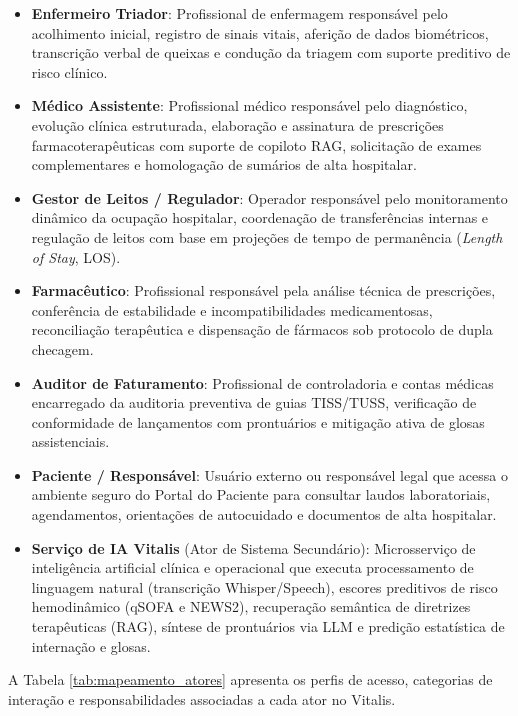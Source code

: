 \begin{itemize}[leftmargin=*]
    \item \textbf{Enfermeiro Triador}: Profissional de enfermagem responsável pelo acolhimento inicial, registro de sinais vitais, aferição de dados biométricos, transcrição verbal de queixas e condução da triagem com suporte preditivo de risco clínico.
    \item \textbf{Médico Assistente}: Profissional médico responsável pelo diagnóstico, evolução clínica estruturada, elaboração e assinatura de prescrições farmacoterapêuticas com suporte de copiloto RAG, solicitação de exames complementares e homologação de sumários de alta hospitalar.
    \item \textbf{Gestor de Leitos / Regulador}: Operador responsável pelo monitoramento dinâmico da ocupação hospitalar, coordenação de transferências internas e regulação de leitos com base em projeções de tempo de permanência (\textit{Length of Stay}, LOS).
    \item \textbf{Farmacêutico}: Profissional responsável pela análise técnica de prescrições, conferência de estabilidade e incompatibilidades medicamentosas, reconciliação terapêutica e dispensação de fármacos sob protocolo de dupla checagem.
    \item \textbf{Auditor de Faturamento}: Profissional de controladoria e contas médicas encarregado da auditoria preventiva de guias TISS/TUSS, verificação de conformidade de lançamentos com prontuários e mitigação ativa de glosas assistenciais.
    \item \textbf{Paciente / Responsável}: Usuário externo ou responsável legal que acessa o ambiente seguro do Portal do Paciente para consultar laudos laboratoriais, agendamentos, orientações de autocuidado e documentos de alta hospitalar.
    \item \textbf{Serviço de IA Vitalis} (Ator de Sistema Secundário): Microsserviço de inteligência artificial clínica e operacional que executa processamento de linguagem natural (transcrição Whisper/Speech), escores preditivos de risco hemodinâmico (qSOFA e NEWS2), recuperação semântica de diretrizes terapêuticas (RAG), síntese de prontuários via LLM e predição estatística de internação e glosas.
\end{itemize}

A Tabela \ref{tab:mapeamento_atores} apresenta os perfis de acesso, categorias de interação e responsabilidades associadas a cada ator no Vitalis.

